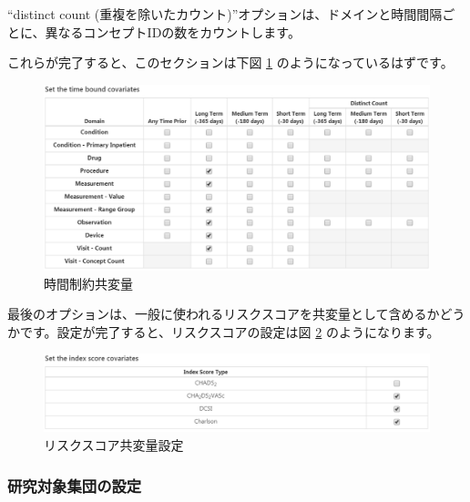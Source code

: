 \documentclass[
  11pt]{book}
\theoremstyle{definition}
\theoremstyle{definition}
\theoremstyle{definition}
\theoremstyle{definition}
\theoremstyle{remark}
\begin{document}
``distinct count (重複を除いたカウント)''オプションは、ドメインと時間間隔ごとに、異なるコンセプトIDの数をカウントします。

これらが完了すると、このセクションは下図 \ref{fig:covariateSettings5} のようになっているはずです。

\begin{figure}

{\centering \includegraphics[width=1\linewidth]{images/PatientLevelPrediction/covariateSettings5} 

}

\caption{時間制約共変量}\label{fig:covariateSettings5}
\end{figure}

最後のオプションは、一般に使われるリスクスコアを共変量として含めるかどうかです。設定が完了すると、リスクスコアの設定は図 \ref{fig:covariateSettings6} のようになります。

\begin{figure}

{\centering \includegraphics[width=1\linewidth]{images/PatientLevelPrediction/covariateSettings6} 

}

\caption{リスクスコア共変量設定}\label{fig:covariateSettings6}
\end{figure}

\subsubsection*{研究対象集団の設定}\label{ux7814ux7a76ux5bfeux8c61ux96c6ux56e3ux306eux8a2dux5b9a}
\end{document}
